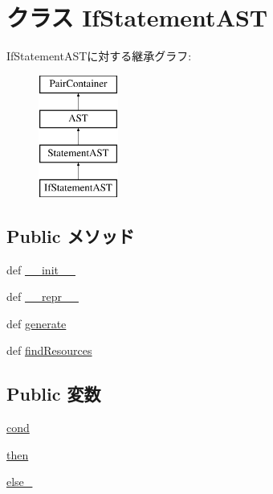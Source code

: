 \hypertarget{classslicc_1_1ast_1_1IfStatementAST_1_1IfStatementAST}{
\section{クラス IfStatementAST}
\label{classslicc_1_1ast_1_1IfStatementAST_1_1IfStatementAST}
}
IfStatementASTに対する継承グラフ:\begin{figure}[H]
\begin{center}
\leavevmode
\includegraphics[height=4cm]{classslicc_1_1ast_1_1IfStatementAST_1_1IfStatementAST}
\end{center}
\end{figure}
\subsection*{Public メソッド}
\begin{DoxyCompactItemize}
\item 
def \hyperlink{classslicc_1_1ast_1_1IfStatementAST_1_1IfStatementAST_ac775ee34451fdfa742b318538164070e}{\_\-\_\-init\_\-\_\-}
\item 
def \hyperlink{classslicc_1_1ast_1_1IfStatementAST_1_1IfStatementAST_ad8b9328939df072e4740cd9a63189744}{\_\-\_\-repr\_\-\_\-}
\item 
def \hyperlink{classslicc_1_1ast_1_1IfStatementAST_1_1IfStatementAST_a4555d1cee0dccf3942ea35fe86de2e8e}{generate}
\item 
def \hyperlink{classslicc_1_1ast_1_1IfStatementAST_1_1IfStatementAST_abd195c795639b490ba2de4c1246105f1}{findResources}
\end{DoxyCompactItemize}
\subsection*{Public 変数}
\begin{DoxyCompactItemize}
\item 
\hyperlink{classslicc_1_1ast_1_1IfStatementAST_1_1IfStatementAST_aa3e1006f963b76263ca7b02f678a7cb4}{cond}
\item 
\hyperlink{classslicc_1_1ast_1_1IfStatementAST_1_1IfStatementAST_a751ff7ed91d2e43008930137c9fa6925}{then}
\item 
\hyperlink{classslicc_1_1ast_1_1IfStatementAST_1_1IfStatementAST_aaea6e460621f847339460d1443815e5d}{else\_\-}
\end{DoxyCompactItemize}


